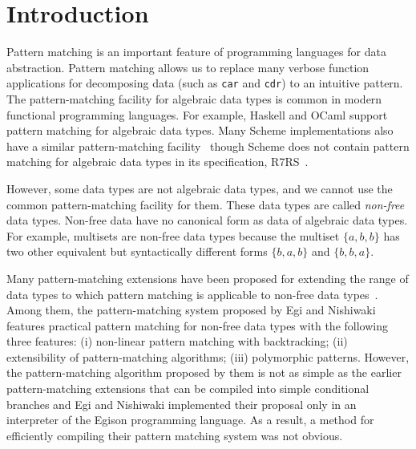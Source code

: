 \documentclass[acmlarge]{acmart}
\begin{document}



\maketitle

\section{Introduction}\label{intro}

Pattern matching is an important feature of programming languages for data abstraction.
Pattern matching allows us to replace many verbose function applications for decomposing data (such as \lstinline{car} and \lstinline{cdr}) to an intuitive pattern.
The pattern-matching facility for algebraic data types is common in modern functional programming languages.
For example, Haskell and OCaml support pattern matching for algebraic data types.
Many Scheme implementations also have a similar pattern-matching facility~\cite{gauchePM} though Scheme does not contain pattern matching for algebraic data types in its specification, R7RS~\cite{shinn2013revised}.

However, some data types are not algebraic data types, and we cannot use the common pattern-matching facility for them.
These data types are called \emph{non-free} data types.
Non-free data have no canonical form as data of algebraic data types.
For example, multisets are non-free data types because the multiset $\{a,b,b\}$ has two other equivalent but syntactically different forms $\{b,a,b\}$ and $\{b,b,a\}$.

Many pattern-matching extensions have been proposed for extending the range of data types to which pattern matching is applicable to non-free data types~\cite{Hudak07ahistory,turner2012some}.
Among them, the pattern-matching system proposed by Egi and Nishiwaki~\cite{egi2018aplas} features practical pattern matching for non-free data types with the following three features: (i) non-linear pattern matching with backtracking; (ii) extensibility of pattern-matching algorithms; (iii) polymorphic patterns.
However, the pattern-matching algorithm proposed by them is not as simple as the earlier pattern-matching extensions that can be compiled into simple conditional branches and Egi and Nishiwaki implemented their proposal only in an interpreter of the Egison programming language.
As a result, a method for efficiently compiling their pattern matching system was not obvious.
\end{document}
